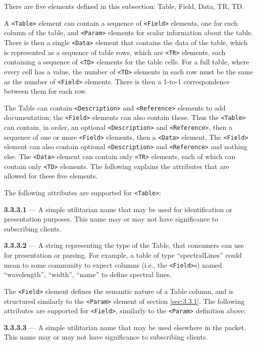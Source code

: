 \documentclass[11pt,a4paper]{ivoa}
\begin{document}
There are five elements defined in this subsection: Table, Field, Data, TR, TD.

A \verb|<Table>| element can contain a sequence of \verb|<Field>| elements, one
for each column of the table, and \verb|<Param>| elements for scalar information
about the table. There is then a single \verb|<Data>| element that contains the
data of the table, which is represented as a sequence of table rows, which are
\verb|<TR>| elements, each containing a sequence of \verb|<TD>| elements for the
table cells. For a full table, where every cell has a value, the number
of \verb|<TD>| elements in each row must be the same as the number of \verb|<Field>|
elements. There is then a 1-to-1 correspondence between them for each row.

The Table can contain \verb|<Description>| and \verb|<Reference>| elements to add
documentation; the \verb|<Field>| elements can also contain these. Thus
the \verb|<Table>| can contain, in order, an optional \verb|<Description>| and
\verb|<Reference>|, then a sequence of one or more \verb|<Field>| elements, then a
\verb|<Data>| element. The \verb|<Field>| element can also contain
optional \verb|<Description>| and \verb|<Reference>| and nothing else. The \verb|<Data>| element
can contain only \verb|<TR>| elements, each of which can contain only \verb|<TD>|
elements. The following explains the attributes that are allowed for these five
elements.

The following attributes are supported for \verb|<Table>|:

\noindent \textbf{3.3.3.1} \label{sec:3.3.3.1} --- A simple utilitarian
name that may be used for identification or presentation purposes. This name
may or may not have significance to subscribing clients.

\noindent \textbf{3.3.3.2} \label{sec:3.3.3.2} --- A string representing
the type of the Table, that consumers can use for presentation or parsing. For
example, a table of type ``spectralLines'' could mean to some community to
expect columns (i.e., the \verb|<Field>|s) named ``wavelength'', ``width'',
``name'' to define spectral lines.

The \verb|<Field>| element defines the semantic nature of a Table column, and is
structured similarly to the \verb|<Param>| element of section \ref{sec:3.3.1}.
The following attributes are supported for \verb|<Field>|, similarly to the
\verb|<Param>| definition above:

\noindent \textbf{3.3.3.3} \label{sec:3.3.3.3} --- A simple utilitarian
name that may be used elsewhere in the packet. This name may or may not have
significance to subscribing clients.
\end{document}
